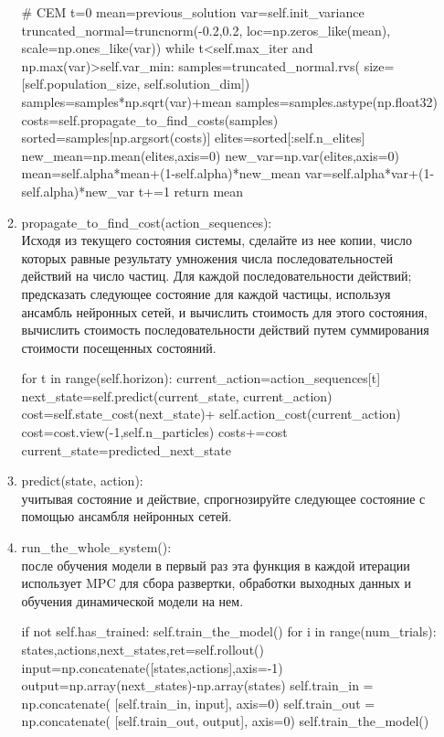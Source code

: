 \documentclass[a4paper,12pt]{article}
\begin{document}
\begin{enumerate}
\begin{enumerate}
\begin{python}
# CEM
t=0
mean=previous_solution
var=self.init_variance
truncated_normal=truncnorm(-0.2,0.2,
    loc=np.zeros_like(mean),
    scale=np.ones_like(var))
while t<self.max_iter and 
        np.max(var)>self.var_min:
    samples=truncated_normal.rvs(
        size=[self.population_size,
                self.solution_dim])
    samples=samples*np.sqrt(var)+mean
    samples=samples.astype(np.float32)
    costs=self.propagate_to_find_costs(samples)
    sorted=samples[np.argsort(costs)]
    elites=sorted[:self.n_elites]
    new_mean=np.mean(elites,axis=0)
    new_var=np.var(elites,axis=0)
    mean=self.alpha*mean+(1-self.alpha)*new_mean
    var=self.alpha*var+(1-self.alpha)*new_var
    t+=1
return mean
\end{python}
\newpage
\item propagate\_to\_find\_cost(action\_sequences):\\
Исходя из текущего состояния системы, сделайте из нее копии, число которых равные результату умножения числа последовательностей действий на число частиц. Для каждой последовательности действий; предсказать следующее состояние для каждой частицы, используя ансамбль нейронных сетей, и вычислить стоимость для этого состояния, вычислить стоимость последовательности действий путем суммирования стоимости посещенных состояний.
\begin{python}
for t in range(self.horizon):
    current_action=action_sequences[t]
    next_state=self.predict(current_state,
                            current_action)
    cost=self.state_cost(next_state)+
            self.action_cost(current_action)
    cost=cost.view(-1,self.n_particles)
    costs+=cost
    current_state=predicted_next_state
\end{python}
\item predict(state, action):\\
учитывая состояние и действие, спрогнозируйте следующее состояние с помощью ансамбля нейронных сетей.
\item run\_the\_whole\_system():\\
после обучения модели в первый раз эта функция в каждой итерации использует MPC для сбора развертки, обработки выходных данных и обучения динамической модели на нем.
\begin{python}
if not self.has_trained:
    self.train_the_model()
for i in range(num_trials):
    states,actions,next_states,ret=self.rollout()
    input=np.concatenate([states,actions],axis=-1)
    output=np.array(next_states)-np.array(states)
    self.train_in = np.concatenate(
                   [self.train_in, input], axis=0)
    self.train_out = np.concatenate(
                 [self.train_out, output], axis=0)
    self.train_the_model()
\end{python}
\end{enumerate}
\end{enumerate}
\newpage
\end{document}
